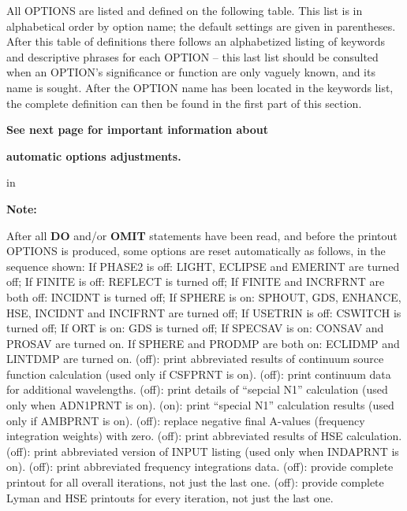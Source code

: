 All OPTIONS are listed and defined on the following table. This list is
in alphabetical order by option name; the default settings are given
in parentheses. After this table of definitions there follows an
alphabetized listing of keywords and descriptive phrases for each
OPTION -- this last list should be consulted when an OPTION's significance
or function are only vaguely known, and its name is sought. After
the OPTION name has been located in the keywords list, the complete
definition can then be found in the first part of this section.
\blankline
\blankline
\centerline{\bf See next page for important information about}
\centerline{\bf automatic options adjustments.}
\ej
\top
{} in
\centerline{\bf Note:}
\blankline
After all {\bf DO} and/or {\bf OMIT} statements have been read, and before
the \break printout OPTIONS is produced, some options are reset automatically
as follows, in the sequence shown:
\bull If PHASE2 is off: LIGHT, ECLIPSE and EMERINT are turned off;
\bull If FINITE is off: REFLECT is turned off;
\bull If FINITE and INCRFRNT are both off: INCIDNT is turned off;
\bull If SPHERE is on: SPHOUT, GDS, ENHANCE, HSE, INCIDNT and
\break INCIFRNT are turned off;
\bull If USETRIN is off: CSWITCH is turned off;
\bull If ORT is on: GDS is turned off;
\bull If SPECSAV is on: CONSAV and PROSAV are turned on.
\bull If SPHERE and PRODMP are both on: ECLIDMP and LINTDMP are turned on.
\ej
\parindent=0pt
\space \vbox { (off): \bang
print abbreviated results of continuum source function calculation
(used only if CSFPRNT is on).}
\space \vbox { (off): \bang
print continuum data for additional wavelengths.}
\space \vbox { (off): \bang
print details of ``sepcial N1'' calculation (used only when ADN1PRNT
is on).}
\space \vbox { (on): \bang
print ``special N1'' calculation results (used only if AMBPRNT is on).}
\space \vbox { (off): \bang
replace negative final A-values (frequency integration weights) with zero.}
\space \vbox { (off): \bang
print abbreviated results of HSE calculation.}
\space \vbox { (off): \bang
print abbreviated version of INPUT listing (used only when INDAPRNT
is on).}
\space \vbox { (off): \bang
print abbreviated frequency integrations data.}
\space \vbox { (off): \bang 
provide complete printout for all overall iterations,
not just the last one.}
\space \vbox { (off): \bang 
provide complete Lyman and HSE printouts for every
iteration, not just the last one.}
